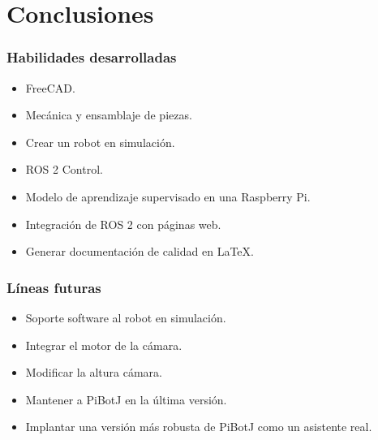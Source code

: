 \documentclass{beamer}
\begin{document}
\section{Conclusiones}
\begin{frame}
\frametitle{Habilidades desarrolladas}
\begin{itemize}
\item FreeCAD.
\item Mecánica y ensamblaje de piezas.
\item Crear un robot en simulación.
\item ROS 2 Control.
\item Modelo de aprendizaje supervisado en una Raspberry Pi.
\item Integración de ROS 2 con páginas web.
\item Generar documentación de calidad en LaTeX.
\end{itemize}
\end{frame}
	

\begin{frame}
\frametitle{Líneas futuras}
\begin{itemize}
\item Soporte software al robot en simulación.
\item Integrar el motor de la cámara.
\item Modificar la altura cámara.
\item Mantener a PiBotJ en la última versión.
\item Implantar una versión más robusta de PiBotJ como un asistente real.
\end{itemize}
\end{frame}

\begin{frame}[plain]
\large{\titlepage}
\end{frame}


\end{document}
